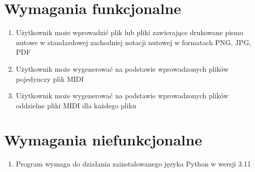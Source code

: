 \section{Wymagania funkcjonalne}
	\begin{enumerate}
		\item Użytkownik może wprowadzić plik lub pliki zawierające drukowane pismo nutowe w standardowej zachodniej notacji nutowej w formatach PNG, JPG, PDF
		\item Użytkownik może wygenerować na podstawie wprowadzonych plików pojedynczy plik MIDI
		\item Użytkownik może wygenerować na podstawie wprowadzonych plików oddzielne pliki MIDI dla każdego pliku
	\end{enumerate}
	
	
\section{Wymagania niefunkcjonalne}

	\begin{enumerate}
		\item Program wymaga do działania zainstalowanego języka Python w wersji 3.11
	\end{enumerate}